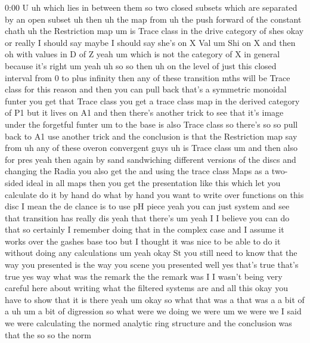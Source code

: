 \begin{unfinished}{0:00}
U  uh  which  lies  in  between  them  so  two
closed  subsets  which  are  separated  by  an
open  subset  uh  then  uh  the  map  from  uh
the  push  forward  of  the  constant  chath
uh  the  Restriction
map
um  is  Trace
class  in  the  drive  category  of
shes  okay  or  really  I  should  say  maybe  I
should  say  she's  on  X
Val
um  Shi  on  X  and  then  oh  with  values  in  D
of  Z  yeah
um  which  is  not  the  category  of  X  in
general  because  it's
right
um  yeah  uh
so  so  then  uh  on  the  level  of  just  this
closed  interval  from  0  to  plus  infinity
then  any  of  these  transition  mths  will
be  Trace  class  for  this  reason  and  then
you  can  pull  back  that's  a  symmetric
monoidal  funter  you  get  that  Trace  class
you  get  a  trace  class  map  in  the  derived
category  of  P1  but  it  lives  on  A1  and
then  there's  another  trick  to  see  that
it's  image  under  the  forgetful
funter  um  to  the  base  is  also  Trace
class  so  there's  so  so  pull
back  to  A1  use  another
trick  and  the  conclusion  is  that  the
Restriction  map  say  from  uh  any  of  these
overon  convergent  guys
uh  is  Trace
class  um  and  then  also  for  pres  yeah
then  again  by  sand  sandwiching  different
versions  of  the  discs  and  changing  the
Radia  you  also  get  the  and  using  the
trace  class  Maps  as  a  two-sided  ideal  in
all  maps  then  you  get  the  presentation
like  this  which  let  you  calculate  do  it
by  hand  do  what  by
hand  you  want  to  write  over  functions  on
this  disc  I  mean  the  de  clance  is  to  use
pH  piece  yeah  you  can  just  system  and
see  that  transition  has  really
dis  yeah  that  there's  um  yeah  I  I
believe  you  can  do  that  so  certainly  I
remember  doing  that  in  the  complex  case
and  I  assume  it  works  over  the  gashes
base  too  but  I  thought  it  was  nice  to  be
able  to  do  it  without  doing  any
calculations  um
yeah
okay  St  you  still  need  to  know  that  the
way  you  presented  is  the  way  you  scene
you
presented  well  yes  that's  true  that's
true
yes  way  what  was  the  remark  the  the
remark  was  I  I  wasn't  being  very  careful
here  about  writing  what  the  filtered
systems  are  and  all  this  okay  you  have
to  show  that  it  is  there
yeah  um  okay  so  what  that  was  a  that  was
a  a  bit  of  a  uh  um  a  bit  of  digression
so  what  were  we  doing  we  were  um  we  were
we  I  said  we  were  calculating  the  normed
analytic  ring  structure  and  the
conclusion  was  that  the  so  so  the  norm

\end{unfinished}
